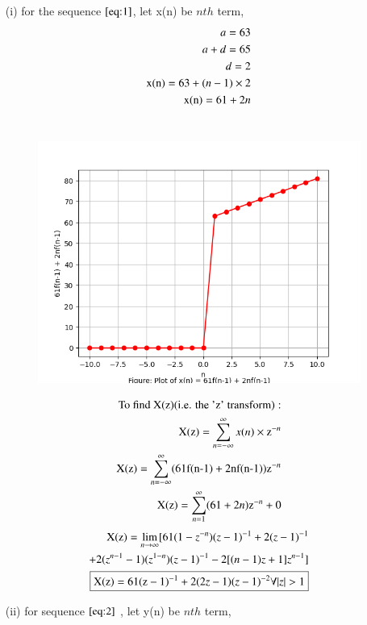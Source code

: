 \documentclass[journal,12pt,twocolumn]{IEEEtran}
\theoremstyle{remark}
\begin{document}
\begin{enumerate}
\item [(i)]
for the sequence $ \eqref{eq:1}$, let x(n) be $ nth$ term,
\begin{align}
\notag a = 63\\
\notag a+d = 65\\
\notag d = 2\\
\notag \text{x(n)} = 63 + (n-1)\times2\\
\text{x(n)} = 61 + 2n \label{eq:3}
\end{align}
\\
\begin{figure}
    \includegraphics[width = 11cm]{Figure_1.png}
\end{figure}
\begin{align}
\text{To find X(z)(i.e. the 'z' transform)}:\\
\text{X(z)} = \sum_{n=-\infty}^{\infty} x(n)\times \text{z}^{-n}\\
\notag \text{X(z)} = \sum_{n=-\infty}^{\infty} (61\text{f(n-1)} + 2\text{nf(n-1)})\text{z}^{-n}\\
\text{X(z)} = \sum_{n=1}^{\infty} (61 + 2n)\text{z}^{-n} + 0
\end{align}
\begin{align}
\notag \text{X(z)} = \lim_{n\to\infty} [61(1-z^{-n})(z-1)^{-1}+ 2(z-1)^{-1}\\
+ 2(z^{n-1}-1)(z^{1-n})(z-1)^{-1}-2[(n-1)z+1]z^{n-1}]\\
\boxed{\text{X(z)} = 61(\text{z}-1)^{-1} + 2(2z-1)(z-1)^{-2}  \forall  |z|>1}
\end{align}
\item[(ii)]
for sequence $ \eqref{eq:2}$ , let y(n) be $ nth$ term,

\end{enumerate}
\end{document}
